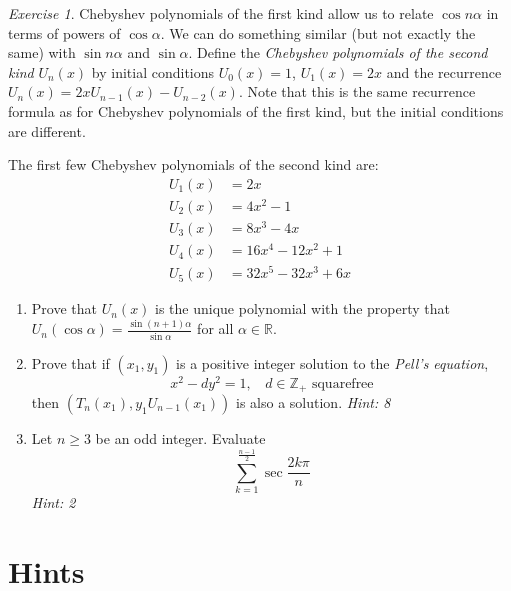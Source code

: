 \documentclass{article}
\theoremstyle{definition}
\theoremstyle{remark}
\newtheorem{exercise}{Exercise}
\newcommand{\RR}{\mathbb{R}}
\newcommand{\ZZ}{\mathbb{Z}}
\newcommand{\geqs}{\geqslant}
\begin{document}
\begin{exercise}
Chebyshev polynomials of the first kind allow us to relate $\cos{n\alpha}$ in terms of powers of $\cos\alpha$. We can do something similar (but not exactly the same) with $\sin{n\alpha}$ and $\sin\alpha$. Define the \emph{Chebyshev polynomials of the second kind} $U_n(x)$ by initial conditions $U_0(x)=1$, $U_1(x)=2x$ and the recurrence $U_n(x)=2xU_{n-1}(x)-U_{n-2}(x)$. Note that this is the same recurrence formula as for Chebyshev polynomials of the first kind, but the initial conditions are different.

The first few Chebyshev polynomials of the second kind are:
\begin{align*}
    U_1(x)&= 2x \\
    U_2(x)&= 4x^2-1 \\
    U_3(x) &= 8x^3-4x \\
    U_4(x) &= 16x^4-12x^2+1 \\
    U_5(x) &= 32x^5-32x^3+6x
\end{align*}
\begin{enumerate}[label=(\alph*)]
    \item Prove that $U_n(x)$ is the unique polynomial with the property that $U_n(\cos\alpha)=\frac{\sin(n+1)\alpha}{\sin\alpha}$ for all $\alpha\in \RR$.
    \item Prove that if $(x_1,y_1)$ is a positive integer solution to the \emph{Pell's equation}, \[x^2-dy^2 = 1,\ \ \ \ \text{$d\in\ZZ_+$ squarefree}\] then $(T_n(x_1),y_1U_{n-1}(x_1))$ is also a solution. \emph{Hint: 8}
    \item Let $n\geqs 3$ be an odd integer. Evaluate
    \[\sum_{k=1}^{\frac{n-1}{2}}\sec\frac{2k\pi}{n}\] \emph{Hint: 2}
\end{enumerate}
\end{exercise}

\section{Hints}
\end{document}
